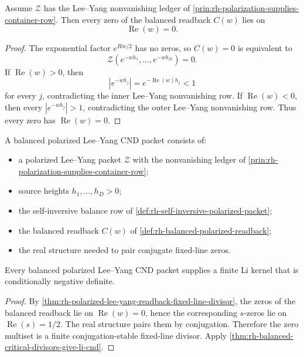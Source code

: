 \begin{theorem}
\label{thm:rh-polarized-lee-yang-readback-fixed-line-divisor}
Assume $\mathcal Z$ has the Lee--Yang nonvanishing ledger of
\autoref{prin:rh-polarization-supplies-container-row}.  Then every zero
of the balanced readback $C(w)$ lies on
$$
\operatorname{Re}(w)=0.
$$
\end{theorem}

\begin{proof}
The exponential factor $e^{Hw/2}$ has no zeros, so $C(w)=0$ is
equivalent to
$$
\mathcal Z(e^{-wh_1},\ldots,e^{-wh_D})=0.
$$
If $\operatorname{Re}(w)>0$, then
$$
|e^{-wh_j}|=e^{-\operatorname{Re}(w)h_j}<1
$$
for every $j$, contradicting the inner Lee--Yang nonvanishing row.  If
$\operatorname{Re}(w)<0$, then every $|e^{-wh_j}|>1$, contradicting the
outer Lee--Yang nonvanishing row.  Thus every zero has
$\operatorname{Re}(w)=0$.
\end{proof}

\begin{definition}
\label{def:rh-balanced-polarized-lee-yang-cnd-packet}
A balanced polarized Lee--Yang CND packet consists of:

\begin{itemize}
\item a polarized Lee--Yang packet $\mathcal Z$ with the nonvanishing
ledger of \autoref{prin:rh-polarization-supplies-container-row};
\item source heights $h_1,\ldots,h_D>0$;
\item the self-inversive balance row of
\autoref{def:rh-self-inversive-polarized-packet};
\item the balanced readback $C(w)$ of
\autoref{def:rh-balanced-polarized-readback};
\item the real structure needed to pair conjugate fixed-line zeros.
\end{itemize}
\end{definition}

\begin{theorem}
\label{thm:rh-balanced-polarized-packets-give-finite-li-cnd}
Every balanced polarized Lee--Yang CND packet supplies a finite Li kernel
that is conditionally negative definite.
\end{theorem}

\begin{proof}
By
\autoref{thm:rh-polarized-lee-yang-readback-fixed-line-divisor}, the
zeros of the balanced readback lie on $\operatorname{Re}(w)=0$, hence
the corresponding $s$-zeros lie on $\operatorname{Re}(s)=1/2$.  The real
structure pairs them by conjugation.  Therefore the zero multiset is a
finite conjugation-stable fixed-line divisor.  Apply
\autoref{thm:rh-balanced-critical-divisors-give-li-cnd}.
\end{proof}

